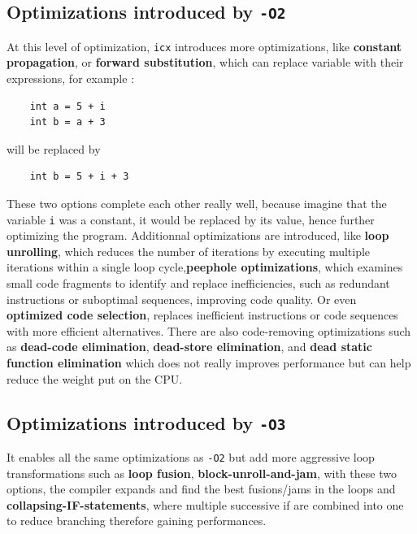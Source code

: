 \documentclass{rapport}
\newcommand{\icx}{\texttt{icx} }
\newcommand{\optitwo}{\texttt{-O2} }
\newcommand{\optithree}{\texttt{-O3} }
\begin{document}
\subsection*{Optimizations introduced by \optitwo}
At this level of optimization, \icx introduces more optimizations, like \textbf{constant propagation}, or \textbf{forward substitution}, which can replace variable with their expressions, for example : 
\begin{verbatim}
    int a = 5 + i
    int b = a + 3
\end{verbatim}
will be replaced by
\begin{verbatim}
    int b = 5 + i + 3
\end{verbatim}
These two options complete each other really well, because imagine that the variable \texttt{i} was a constant, it would be replaced by its value, hence further optimizing the program.\newline\newline
Additionnal optimizations are introduced, like \textbf{loop unrolling}, which reduces the number of iterations by executing multiple iterations within a single loop cycle,\textbf{peephole optimizations}, which examines small code fragments to identify and replace inefficiencies, such as redundant instructions or suboptimal sequences, improving code quality. Or even \textbf{optimized code selection}, replaces inefficient instructions or code sequences with more efficient alternatives.
\newline\newline
There are also code-removing optimizations such as \textbf{dead-code elimination}, \textbf{dead-store elimination}, and \textbf{dead static function elimination} which does not really improves performance but can help reduce the weight put on the CPU.

\subsection*{Optimizations introduced by \optithree}
It enables all the same optimizations as \optitwo but add more aggressive loop transformations such as \textbf{loop fusion}, \textbf{block-unroll-and-jam}, with these two options, the compiler expands and find the best fusions/jams in the loops and \textbf{collapsing-IF-statements}, where multiple successive if are combined into one to reduce branching therefore gaining performances.
\end{document}
